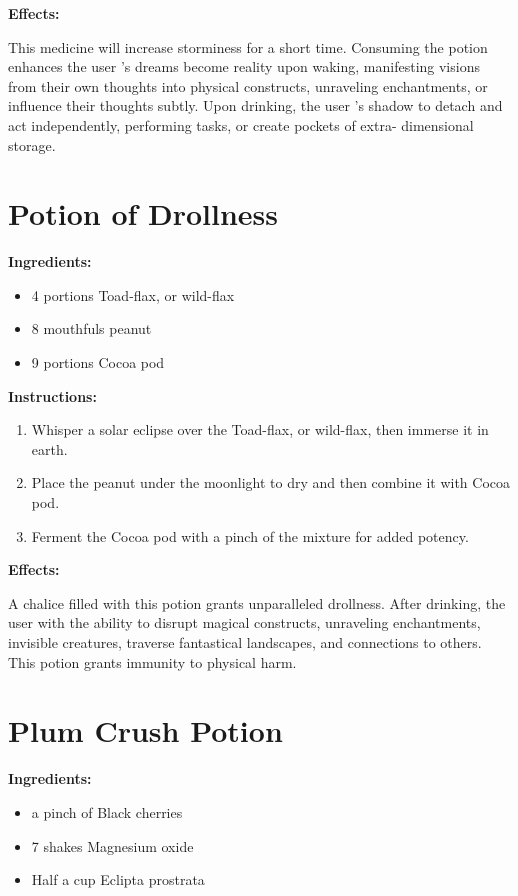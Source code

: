 \documentclass{article}
\begin{document}
\textbf{Effects:}

This medicine will increase storminess for a short time. Consuming the potion enhances the user 's dreams become reality upon waking, manifesting visions from their own thoughts into physical constructs, unraveling enchantments, or influence their thoughts subtly. Upon drinking, the user 's shadow to detach and act independently, performing tasks, or create pockets of extra- dimensional storage.

\newpage
\section*{Potion of Drollness}

\textbf{Ingredients:}

\begin{itemize}
  \item 4 portions Toad-flax, or wild-flax
  \item 8 mouthfuls peanut
  \item 9 portions Cocoa pod
\end{itemize}

\textbf{Instructions:}

\begin{enumerate}
  \item Whisper a solar eclipse over the Toad-flax, or wild-flax, then immerse it in earth.
  \item Place the peanut under the moonlight to dry and then combine it with Cocoa pod.
  \item Ferment the Cocoa pod with a pinch of the mixture for added potency.
\end{enumerate}

\textbf{Effects:}

A chalice filled with this potion grants unparalleled drollness. After drinking, the user with the ability to disrupt magical constructs, unraveling enchantments, invisible creatures, traverse fantastical landscapes, and connections to others. This potion grants immunity to physical harm.

\newpage
\section*{Plum Crush Potion}

\textbf{Ingredients:}

\begin{itemize}
  \item a pinch of Black cherries
  \item 7 shakes Magnesium oxide
  \item Half a cup Eclipta prostrata
\end{itemize}
\end{document}
